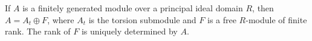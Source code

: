 If $A$ is a finitely generated module over a principal ideal domain $R$, then $A = A_t \oplus F$, where $A_t$ is the torsion submodule and $F$ is a free $R$-module of finite rank. The rank of $F$ is uniquely determined by $A$.
